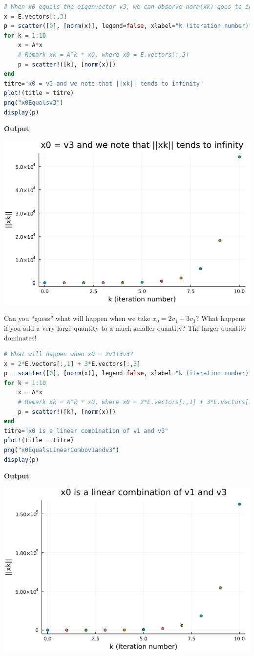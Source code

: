 \begin{lstlisting}[language=Julia,style=mystyle]
# When x0 equals the eigenvector v3, we can observe norm(xk) goes to infinity
x = E.vectors[:,3]
p = scatter([0], [norm(x)], legend=false, xlabel="k (iteration number)", ylabel="||xk||")
for k = 1:10
    x = A*x
    # Remark xk = A^k * x0, where x0 = E.vectors[:,3]
    p = scatter!([k], [norm(x)])
end
titre="x0 = v3 and we note that ||xk|| tends to infinity"
plot!(title = titre)
png("x0Equalsv3")
display(p)
\end{lstlisting}
\textbf{Output} 
\begin{center}
\includegraphics[width=0.6\columnwidth]{graphics/Chap08/x0Equalsv3.png} 
\end{center}

Can you ``guess'' what will happen when we take $x_0 =  2v_1+3v_3$? What happens if you add a very large quantity to a much smaller quantity? The larger quantity dominates!\\

\begin{lstlisting}[language=Julia,style=mystyle]
# What will happen when x0 = 2v1+3v3?
x = 2*E.vectors[:,1] + 3*E.vectors[:,3]
p = scatter([0], [norm(x)], legend=false, xlabel="k (iteration number)", ylabel="||xk||")
for k = 1:10
    x = A*x
    # Remark xk = A^k * x0, where x0 = 2*E.vectors[:,1] + 3*E.vectors[:,3]
    p = scatter!([k], [norm(x)])
end
titre="x0 is a linear combination of v1 and v3"
plot!(title = titre)
png("x0EqualsLinearCombov1andv3")
display(p)
\end{lstlisting}
\textbf{Output} 

\begin{center}
\includegraphics[width=0.6\columnwidth]{graphics/Chap08/x0EqualsLinearCombov1andv3.png} 
\end{center} 


